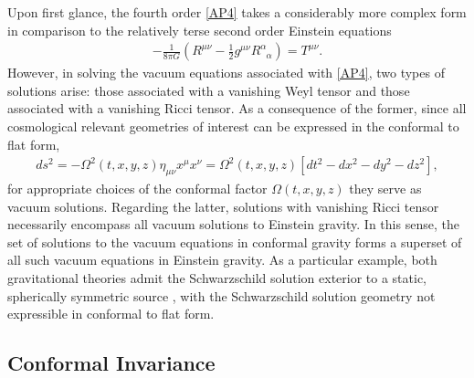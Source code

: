 Upon first glance, the fourth order \eqref{AP4} takes a considerably more complex form in comparison to the relatively terse second order Einstein equations
%
\begin{eqnarray}
-\frac{1}{8\pi G}\left(R^{\mu\nu} -\frac{1}{2}g^{\mu\nu}R^{\alpha}_{\phantom{\alpha}\alpha}\right)=T^{\mu\nu}.
\label{AP5}
\end{eqnarray}
%
However, in solving the vacuum equations associated with \eqref{AP4}, two types of solutions arise: those associated with a vanishing Weyl tensor and those associated with a vanishing Ricci tensor. As a consequence of the former, since all cosmological relevant geometries of interest can be expressed in the conformal to flat form, 
%
\begin{eqnarray}
ds^2=-\Omega^2(t,x,y,z)\eta_{\mu\nu}x^{\mu}x^{\nu}=\Omega^2(t,x,y,z)[dt^2-dx^2-dy^2-dz^2],
\label{AP6}
\end{eqnarray}
%
for appropriate choices of the conformal factor $\Omega(t,x,y,z)$ they serve as vacuum solutions. Regarding the latter, solutions with vanishing Ricci tensor necessarily encompass all vacuum solutions to Einstein gravity. In this sense, the set of solutions to the vacuum equations in conformal gravity forms a superset of all such vacuum equations in Einstein gravity. As a particular example, both gravitational theories admit the Schwarzschild solution exterior to a static, spherically symmetric source \cite{mannheim_kazanas_1988}, with the Schwarzschild  solution geometry not expressible in conformal to flat form. 


\subsection{Conformal Invariance}
\label{ss:conformal_invariance}


